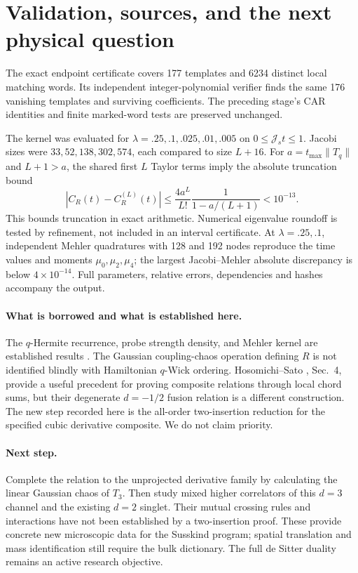 \documentclass[11pt,a4paper]{article}
\newcommand{\Js}{\mathcal J_s}
\begin{document}
\newpage
\section{Validation, sources, and the next physical question}
The exact endpoint certificate covers 177 templates and 6234
distinct local matching words. Its independent integer-polynomial
verifier finds the same 176 vanishing templates and surviving
coefficients. The preceding stage's CAR identities and finite
marked-word tests are preserved unchanged.

The kernel was evaluated for
$\lambda=.25,.1,.025,.01,.005$ on $0\le\Js t\le1$.
Jacobi sizes were $33,52,138,302,574$, each compared to size
$L+16$. For $a=t_{\max}\|T_q\|$ and $L+1>a$, the shared first
$L$ Taylor terms imply the absolute truncation bound
\begin{equation}
 |C_R(t)-C_R^{(L)}(t)|
 \le \frac{4a^L}{L!}\frac{1}{1-a/(L+1)}<10^{-13}.
\end{equation}
This bounds truncation in exact arithmetic. Numerical eigenvalue
roundoff is tested by refinement, not included in an interval
certificate. At $\lambda=.25,.1$, independent Mehler quadratures
with 128 and 192 nodes reproduce the time values and moments
$\mu_0,\mu_2,\mu_4$; the largest Jacobi--Mehler absolute discrepancy
is below $4\times10^{-14}$. Full parameters, relative errors,
dependencies and hashes accompany the output.

\paragraph{What is borrowed and what is established here.}
The $q$-Hermite recurrence, probe strength density, and Mehler
kernel are established results \cite{BNR,TT}. The Gaussian
coupling-chaos operation defining $R$ is not identified blindly
with Hamiltonian $q$-Wick ordering. Hosomichi--Sato
\cite{HS}, Sec.~4, provide a useful precedent for proving composite
relations through local chord sums, but their degenerate
$d=-1/2$ fusion relation is a different construction. The new
step recorded here is the all-order two-insertion reduction for
the specified cubic derivative composite. We do not claim priority.

\paragraph{Next step.}
Complete the relation to the unprojected derivative family by
calculating the linear Gaussian chaos of $T_3$. Then study mixed
higher correlators of this $d=3$ channel and the existing $d=2$
singlet. Their mutual crossing rules and interactions have not
been established by a two-insertion proof. These provide concrete
new microscopic data for the Susskind program; spatial translation
and mass identification still require the bulk dictionary.
The full de Sitter duality remains an active research objective.
\end{document}
